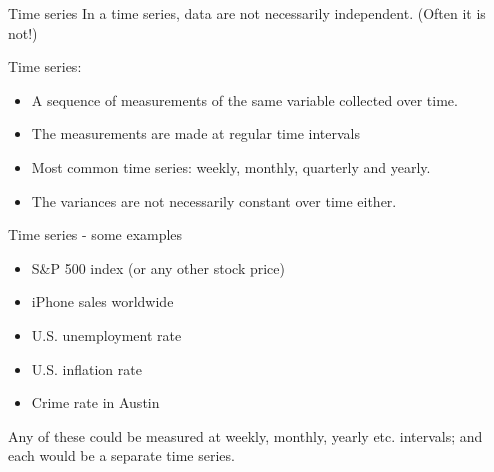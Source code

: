 \documentclass{beamer}\usepackage[]{graphicx}\usepackage[]{color}
\makeatletter
\newcommand{\hlnum}[1]{\textcolor[rgb]{0.824,0.412,0.118}{#1}}%
\newcommand{\hlcom}[1]{\textcolor[rgb]{0.824,0.706,0.549}{#1}}%
\newcommand{\hlopt}[1]{\textcolor[rgb]{1,0.894,0.769}{#1}}%
\newcommand{\hlstd}[1]{\textcolor[rgb]{1,0.894,0.769}{#1}}%
\newcommand{\hlkwb}[1]{\textcolor[rgb]{0.804,0.776,0.451}{#1}}%
\newcommand{\hlkwc}[1]{\textcolor[rgb]{0.78,0.941,0.545}{#1}}%
\newcommand{\hlkwd}[1]{\textcolor[rgb]{1,0.78,0.769}{#1}}%
\newenvironment{kframe}{%
 \def\at@end@of@kframe{}%
 \ifinner\ifhmode%
  \def\at@end@of@kframe{\end{minipage}}%
  \begin{minipage}{\columnwidth}%
 \fi\fi%
 \def\FrameCommand##1{\hskip\@totalleftmargin \hskip-\fboxsep
 \colorbox{shadecolor}{##1}\hskip-\fboxsep
     \hskip-\linewidth \hskip-\@totalleftmargin \hskip\columnwidth}%
 \MakeFramed {\advance\hsize-\width
   \@totalleftmargin\z@ \linewidth\hsize
   \@setminipage}}%
 {\par\unskip\endMakeFramed%
 \at@end@of@kframe}
\newenvironment{knitrout}{}{} %
\makeatother
\begin{document}
\begin{darkframes}
    
    
    
    \begin{frame}{Time series}
      \fontsize{9}{9}\selectfont
        In a \alert{time series,} data are not necessarily independent. (Often it is not!) \pause
        \bigskip
        
        Time series:
        \begin{itemize}
          \item A sequence of measurements of the same variable collected over time.
          \item The measurements are made at regular time intervals
          
          \item Most common time series: weekly, monthly, quarterly and yearly.
          \item The variances are not necessarily constant over time either.
        \end{itemize}
    
    \end{frame}
    
    
    
    \begin{frame}{Time series - some examples}
      \fontsize{9}{9}\selectfont
      \begin{itemize}
        \item S\&P 500 index (or any other stock price)
        \item iPhone sales worldwide
        \item U.S. unemployment rate
        \item U.S. inflation rate
        \item Crime rate in Austin
      \end{itemize} \pause
      \bigskip
      Any of these could be measured at weekly, monthly, yearly etc. intervals; and each would be a separate time series.
    \end{frame}
  
  
\end{darkframes}
\end{document}
